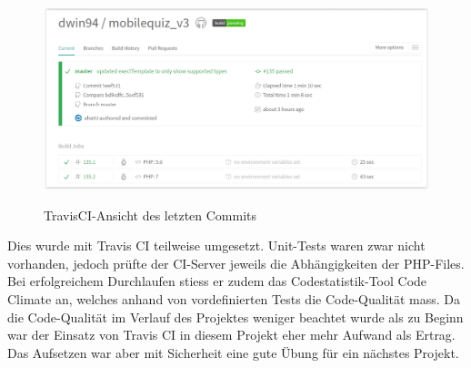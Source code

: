 \begin{figure}[H]
	\centering
	\includegraphics[width=1\textwidth]{Images/travisCI.PNG}
	\caption{TravisCI-Ansicht des letzten Commits}
	\cite{travisCI}
\end{figure}


Dies wurde mit Travis CI \cite{travisCI} teilweise umgesetzt. Unit-Tests waren zwar nicht vorhanden, jedoch prüfte der \acrshort{CI}-Server jeweils die Abhängigkeiten der PHP-Files. Bei erfolgreichem Durchlaufen stiess er zudem das Codestatistik-Tool Code Climate \cite{codeclimate} an, welches anhand von vordefinierten Tests die Code-Qualität mass.
Da die Code-Qualität im Verlauf des Projektes weniger beachtet wurde als zu Beginn war der Einsatz von Travis CI \cite{travisCI} in diesem Projekt eher mehr Aufwand als Ertrag. Das Aufsetzen war aber mit Sicherheit eine gute Übung für ein nächstes Projekt.